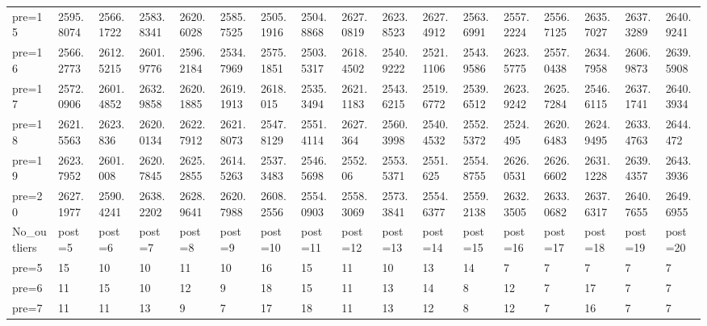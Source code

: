 \documentclass[11pt]{article}
\begin{document}
\begin{tabular}{lllllllllllllllll}
	 pre=15      & 2595.8074   & 2566.1722   & 2583.8341   & 2620.6028   & 2585.7525   & 2505.1916   & 2504.8868   & 2627.0819   & 2623.8523   & 2627.4912   & 2563.6991   & 2557.2224   & 2556.7125   & 2635.7027   & 2637.3289   & 2640.9241  \\
	 pre=16      & 2566.2773   & 2612.5215   & 2601.9776   & 2596.2184   & 2534.7969   & 2575.1851   & 2503.5317   & 2618.4502   & 2540.9222   & 2521.1106   & 2543.9586   & 2623.5775   & 2557.0438   & 2634.7958   & 2606.9873   & 2639.5908  \\
	 pre=17      & 2572.0906   & 2601.4852   & 2632.9858   & 2620.1885   & 2619.1913   & 2618.015    & 2535.3494   & 2621.1183   & 2543.6215   & 2519.6772   & 2539.6512   & 2623.9242   & 2625.7284   & 2546.6115   & 2637.1741   & 2640.3934  \\
	 pre=18      & 2621.5563   & 2623.836    & 2620.0134   & 2622.7912   & 2621.8073   & 2547.8129   & 2551.4114   & 2627.364    & 2560.3998   & 2540.4532   & 2552.5372   & 2524.495    & 2620.6483   & 2624.9495   & 2633.4763   & 2644.472   \\
	 pre=19      & 2623.7952   & 2601.008    & 2620.7845   & 2625.2855   & 2614.5263   & 2537.3483   & 2546.5698   & 2552.06     & 2553.5371   & 2551.625    & 2554.8755   & 2626.0531   & 2626.6602   & 2631.1228   & 2639.4357   & 2643.3936  \\
	 pre=20      & 2627.1977   & 2590.4241   & 2638.2202   & 2628.9641   & 2620.7988   & 2608.2556   & 2554.0903   & 2558.3069   & 2573.3841   & 2554.6377   & 2559.2138   & 2632.3505   & 2633.0682   & 2637.6317   & 2640.7655   & 2649.6955  \\
	 No\_outliers & post=5        & post=6        & post=7        & post=8        & post=9        & post=10       & post=11       & post=12       & post=13       & post=14       & post=15       & post=16       & post=17       & post=18       & post=19       & post=20      \\
	 pre=5       & 15          & 10          & 10          & 11          & 10          & 16          & 15          & 11          & 10          & 13          & 14          & 7           & 7           & 7           & 7           & 7          \\
	 pre=6       & 11          & 15          & 10          & 12          & 9           & 18          & 15          & 11          & 13          & 14          & 8           & 12          & 7           & 17          & 7           & 7          \\
	 pre=7       & 11          & 11          & 13          & 9           & 7           & 17          & 18          & 11          & 13          & 12          & 8           & 12          & 7           & 16          & 7           & 7          \\

\end{tabular}
\end{document}
